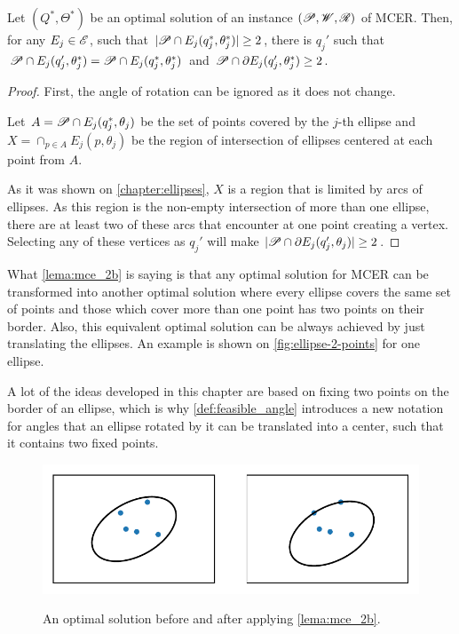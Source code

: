 \begin{proposicao}\label{lema:mce_2b}
	Let $(Q^*, \Theta^*)$ be an optimal solution of an instance $(\mathscr{P}, \mathscr{W}, \mathscr{R})$ of MCER. Then, for any $E_j \in \mathscr{E}$, such that $|\mathscr{P} \cap E_j(q_j^*, \theta_j^*)|\ge2$, there is $q_j'$ such that $\mathscr{P} \cap E_j(q_j', \theta_j^*)=\mathscr{P} \cap E_j(q_j^*, \theta_j^*)$ and $\mathscr{P} \cap \partial E_j(q_j', \theta_j^*) \ge 2$.
\end{proposicao}

\begin{proof}
	First, the angle of rotation can be ignored as it does not change.
	
	Let $A=\mathscr{P} \cap E_j(q_j^*, \theta_j)$ be the set of points covered by the $j$-th ellipse and $X=\cap_{p \in A}E_j(p, \theta_j)$ be the region of intersection of ellipses centered at each point from $A$.

	As it was shown on \autoref{chapter:ellipses}, $X$ is a region that is limited by arcs of ellipses. As this region is the non-empty intersection of more than one ellipse, there are at least two of these arcs that encounter at one point creating a vertex. Selecting any of these vertices as $q_j'$ will make $|\mathscr{P} \cap \partial E_j(q_j', \theta_j)| \ge 2$.
	
\end{proof}

What \autoref{lema:mce_2b} is saying is that any optimal solution for MCER can be transformed into another optimal solution where every ellipse covers the same set of points and those which cover more than one point has two points on their border. Also, this equivalent optimal solution can be always achieved by just translating the ellipses. An example is shown on \autoref{fig:ellipse-2-points} for one ellipse.

A lot of the ideas developed in this chapter are based on fixing two points on the border of an ellipse, which is why \autoref{def:feasible_angle} introduces a new notation for angles that an ellipse rotated by it can be translated into a center, such that it contains two fixed points. 

\begin{figure}[H]
	\centering
	\caption{An optimal solution before and after applying \autoref{lema:mce_2b}.}
	\includegraphics{tex/figures/scripts/ellipse-2-points}
	\fautor
	\label{fig:ellipse-2-points}
\end{figure}

